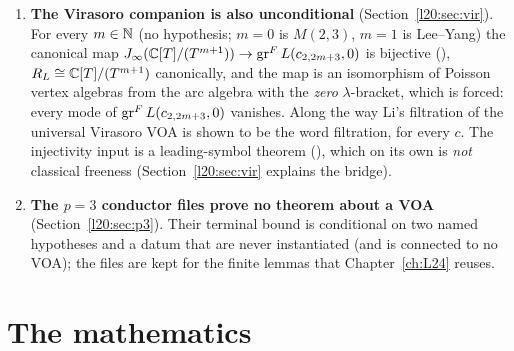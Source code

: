 \begin{enumerate}
  the arc side is built on the \emph{presented} arc algebra $\ltwentyJ(\C[e,h,f]/I_m)$, which \emph{serves as}
  $\ltwentyJ R_V$ through the universal arc  and its proved universal property
  (); there is no $\ltwentyJ$ functor on abstract algebras. The type of
   is a bijection of sets for each coefficient algebra; its naturality in the coefficient
  algebra is a separate theorem (), and together they say that the presented arc algebra
  represents the arc functor of $R_V$ (the bundled textbook form is ).
  The type of  is an abstract isomorphism; it is canonical \emph{by theorem}
  (, ). A few docstrings are
  stale (they still call the now-proved character equality ``remaining''). These are listed in
  Section~\ref{l20:sec:defects}.
\item \textbf{The Virasoro companion is also unconditional} (Section~\ref{l20:sec:vir}). For every $m\in{\mathbb{N}}$ (no hypothesis;
  $m=0$ is $M(2,3)$, $m=1$ is Lee--Yang) the canonical map $J_\infty({\mathbb{C}}[T]/(T^{m+1}))\to\operatorname{gr}^F L(c_{2,2m+3},0)$ is bijective
  (), $R_{L}\cong{\mathbb{C}}[T]/(T^{m+1})$ canonically, and the map is an isomorphism of
  Poisson vertex algebras from the arc algebra with the \emph{zero} $\lambda$-bracket, which is forced: every mode of
  $\operatorname{gr}^F L(c_{2,2m+3},0)$ vanishes. Along the way Li's filtration of the universal Virasoro VOA is shown to be the word filtration,
  for every $c$. The injectivity input is a leading-symbol theorem (), which on its own is \emph{not}
  classical freeness (Section~\ref{l20:sec:vir} explains the bridge).
\item \textbf{The $p=3$ conductor files prove no theorem about a VOA} (Section~\ref{l20:sec:p3}). Their terminal bound is conditional on
  two named hypotheses and a datum  that are never instantiated (and  is
  connected to no VOA); the files are kept for the finite lemmas that Chapter~\ref{ch:L24} reuses.
\end{enumerate}

\section{The mathematics}\label{l20:sec:math}

